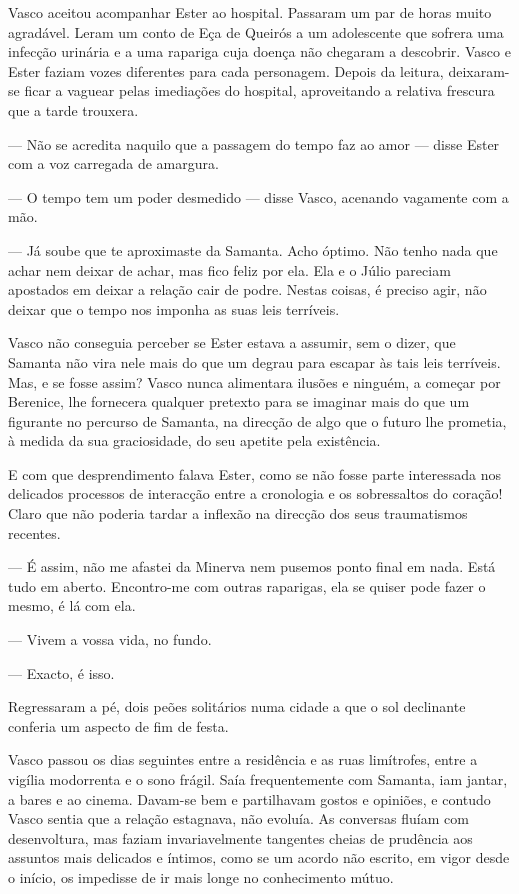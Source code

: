 Vasco aceitou acompanhar Ester ao hospital. Passaram um par de horas
muito agradável. Leram um conto de Eça de Queirós a um adolescente que
sofrera uma infecção urinária e a uma rapariga cuja doença não chegaram
a descobrir. Vasco e Ester faziam vozes diferentes para cada personagem.
Depois da leitura, deixaram-se ficar a vaguear pelas imediações do
hospital, aproveitando a relativa frescura que a tarde trouxera.

--- Não se acredita naquilo que a passagem do tempo faz ao amor --- disse
  Ester com a voz carregada de amargura.

--- O tempo tem um poder desmedido --- disse Vasco, acenando vagamente com
  a mão.

--- Já soube que te aproximaste da Samanta. Acho óptimo. Não tenho nada
  que achar nem deixar de achar, mas fico feliz por ela. Ela e o Júlio
  pareciam apostados em deixar a relação cair de podre. Nestas coisas, é
  preciso agir, não deixar que o tempo nos imponha as suas leis
  terríveis.


Vasco não conseguia perceber se Ester estava a assumir, sem o dizer, que
Samanta não vira nele mais do que um degrau para escapar às tais leis
terríveis. Mas, e se fosse assim? Vasco nunca alimentara ilusões e
ninguém, a começar por Berenice, lhe fornecera qualquer pretexto para se
imaginar mais do que um figurante no percurso de Samanta, na direcção de
algo
que o futuro lhe prometia, à medida da sua graciosidade, do seu apetite
pela existência.

E com que desprendimento falava Ester, como se não fosse parte
interessada nos delicados processos de interacção entre a cronologia e
os sobressaltos do coração! Claro que não poderia tardar a inflexão na
direcção dos seus traumatismos recentes.

--- É assim, não me afastei da Minerva nem pusemos ponto final em nada.
  Está tudo em aberto. Encontro-me com outras raparigas, ela se quiser
  pode fazer o mesmo, é lá com ela.

--- Vivem a vossa vida, no fundo.

--- Exacto, é isso.


Regressaram a pé, dois peões solitários numa cidade a que o sol
declinante conferia um aspecto de fim de festa.

Vasco passou os dias seguintes entre a residência e as ruas limítrofes,
entre a vigília modorrenta e o sono frágil. Saía frequentemente com
Samanta, iam jantar, a bares e ao cinema. Davam-se bem e partilhavam
gostos e opiniões, e contudo Vasco sentia que a relação estagnava, não
evoluía. As conversas fluíam com desenvoltura, mas faziam
invariavelmente tangentes cheias de prudência aos assuntos mais
delicados e íntimos, como se um acordo não escrito, em vigor desde o
início, os impedisse de ir mais longe no conhecimento mútuo.

